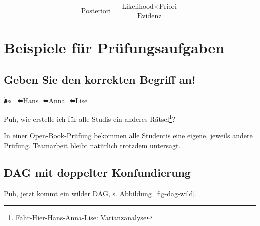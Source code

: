 \documentclass[
  a4paper,
  DIV=11]{scrreprt}
\theoremstyle{definition}
\theoremstyle{remark}
\begin{document}
\[\text{Posteriori} = \frac{\text{Likelihood} \times \text{Priori}}{\text{Evidenz}}\]

\hypertarget{beispiele-fuxfcr-pruxfcfungsaufgaben}{%
\section{Beispiele für
Prüfungsaufgaben}\label{beispiele-fuxfcr-pruxfcfungsaufgaben}}

\hypertarget{geben-sie-den-korrekten-begriff-an}{%
\subsection{Geben Sie den korrekten Begriff
an!}\label{geben-sie-den-korrekten-begriff-an}}

🌬🚙🙋️👨⬅️Hans 👧⬅️Anna 👩⬅️Lise

Puh, wie erstelle ich für alle Studis ein anderes Rätsel\footnote{Fahr-Hier-Hans-Anna-Lise:
  Varianzanalyse}?

\begin{tcolorbox}[enhanced jigsaw, leftrule=.75mm, left=2mm, bottomrule=.15mm, opacityback=0, coltitle=black, colbacktitle=quarto-callout-note-color!10!white, opacitybacktitle=0.6, rightrule=.15mm, toptitle=1mm, colback=white, colframe=quarto-callout-note-color-frame, arc=.35mm, toprule=.15mm, breakable, titlerule=0mm, bottomtitle=1mm, title=\textcolor{quarto-callout-note-color}{\faInfo}\hspace{0.5em}{Hinweis}]
In einer Open-Book-Prüfung bekommen alle Studentis eine eigene, jeweils
andere Prüfung. Teamarbeit bleibt natürlich trotzdem untersagt.
\end{tcolorbox}

\hypertarget{dag-mit-doppelter-konfundierung}{%
\subsection{DAG mit doppelter
Konfundierung}\label{dag-mit-doppelter-konfundierung}}

Puh, jetzt kommt ein wilder DAG, s. Abbildung~\ref{fig-dag-wild}.
\end{document}
